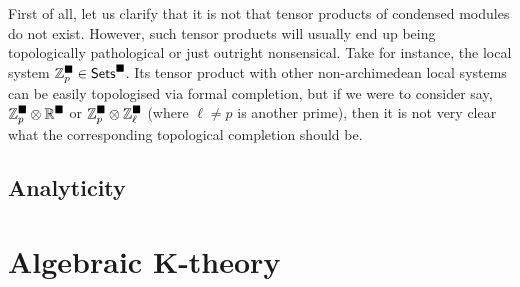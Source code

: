             First of all, let us clarify that it is not that tensor products of condensed modules do not exist. However, such tensor products will usually end up being topologically pathological or just outright nonsensical. Take for instance, the local system $\mathbb{Z}_p^{\blacksquare} \in \mathsf{Sets}^{\blacksquare}$. Its tensor product with other non-archimedean local systems can be easily topologised via formal completion, but if we were to consider say, $\Z_p^{\cond} \tensor \R^{\cond}$ or $\Z_p^{\cond} \tensor \Z_{\ell}^{\cond}$ (where $\ell \not = p$ is another prime), then it is not very clear what the corresponding topological completion should be.  
            
            
        
        \subsection{Analyticity}
        
    \section{Algebraic K-theory}